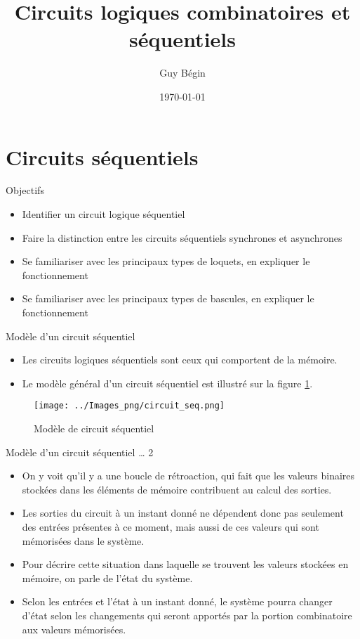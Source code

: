 \documentclass[presentation]{beamer}
\author{Guy Bégin}
\date{\today}
\title{Circuits logiques combinatoires et séquentiels}
\begin{document}
\maketitle

\section{Circuits séquentiels}
\label{sec:org423b946}

\begin{frame}[label={sec:org477fff6}]{Objectifs}
\begin{itemize}
\item Identifier un circuit logique séquentiel
\item Faire la distinction entre les circuits séquentiels synchrones et asynchrones
\item Se familiariser avec les principaux types de loquets, en
expliquer le fonctionnement
\item Se familiariser avec les principaux types de bascules,  en
expliquer le fonctionnement
\end{itemize}
\end{frame}

\begin{frame}[label={sec:org15096fc}]{Modèle d'un circuit séquentiel}
\begin{itemize}
\item Les circuits logiques séquentiels sont ceux qui comportent de la mémoire.

\item Le modèle général d'un circuit séquentiel est illustré sur la figure \ref{fig:orgc1fe005}.
\end{itemize}

\begin{figure}[htbp]
\centering
\texttt{[image: ../Images\_png/circuit\_seq.png]}
\caption{\label{fig:orgc1fe005}Modèle de circuit séquentiel}
\end{figure}
\end{frame}

\begin{frame}[label={sec:org5221e93}]{Modèle d'un circuit séquentiel \ldots{} 2}
\begin{itemize}
\item On y voit qu'il y a une boucle de rétroaction, qui fait que les valeurs binaires stockées dans les éléments de mémoire contribuent au calcul des sorties.

\item Les sorties du circuit à un instant donné ne dépendent donc pas seulement des entrées présentes à ce moment, mais aussi de ces valeurs qui sont mémorisées dans le système.

\item Pour décrire cette situation dans laquelle se trouvent les valeurs stockées en mémoire, on parle de l'\alert{état} du système.

\item Selon les entrées et l'état à un instant donné, le système pourra changer d'état selon les changements qui seront apportés par la portion combinatoire aux valeurs mémorisées.
\end{itemize}
\end{frame}
\end{document}
